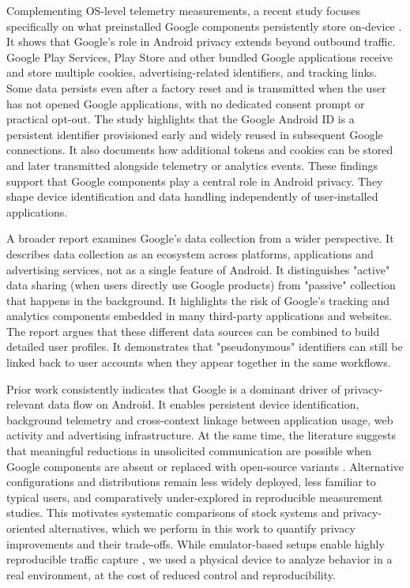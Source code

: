 Complementing OS-level telemetry measurements, a recent study focuses specifically on what preinstalled Google components persistently store on-device \cite{cookies-identifiers2025}. It shows that Google’s role in Android privacy extends beyond outbound traffic. Google Play Services, Play Store and other bundled Google applications receive and store multiple cookies, advertising-related identifiers, and tracking links. Some data persists even after a factory reset and is transmitted when the user has not opened Google applications, with no dedicated consent prompt or practical opt-out. The study highlights that the Google Android ID is a persistent identifier provisioned early and widely reused in subsequent Google connections. It also documents how additional tokens and cookies can be stored and later transmitted alongside telemetry or analytics events. These findings support that Google components play a central role in Android privacy. They shape device identification and data handling independently of user-installed applications.

A broader report \cite{google-data-collection2018} examines Google's data collection from a wider perspective. It describes data collection as an ecosystem across platforms, applications and advertising services, not as a single feature of Android. It distinguishes "active" data sharing (when users directly use Google products) from "passive" collection that happens in the background. It highlights the risk of Google's tracking and analytics components embedded in many third-party applications and websites. The report argues that these different data sources can be combined to build detailed user profiles. It demonstrates that "pseudonymous" identifiers can still be linked back to user accounts when they appear together in the same workflows.

Prior work consistently indicates that Google is a dominant driver of privacy-relevant data flow on Android. It enables persistent device identification, background telemetry and cross-context linkage between application usage, web activity and advertising infrastructure. At the same time, the literature suggests that meaningful reductions in unsolicited communication are possible when Google components are absent or replaced with open-source variants \cite{android-os-snooping2021}. Alternative configurations and distributions remain less widely deployed, less familiar to typical users, and comparatively under-explored in reproducible measurement studies. This motivates systematic comparisons of stock systems and privacy-oriented alternatives, which we perform in this work to quantify privacy improvements and their trade-offs. While emulator-based setups enable highly reproducible traffic capture \cite{parrot2025}, we used a physical device to analyze behavior in a real environment, at the cost of reduced control and reproducibility.